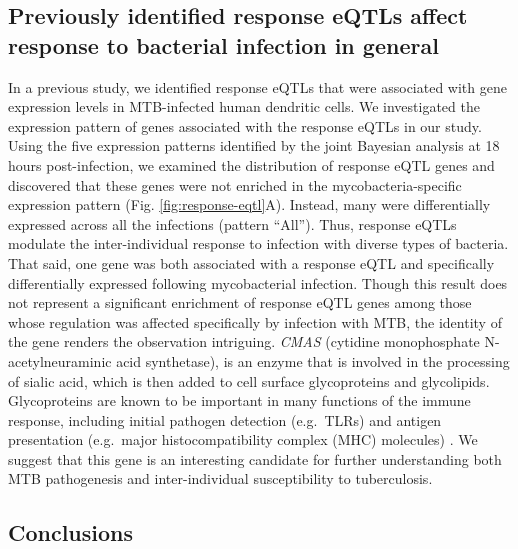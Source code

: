 \subsection{Previously identified response eQTLs affect response to
bacterial infection in
general}\label{previously-identified-response-eqtls-affect-response-to-bacterial-infection-in-general}

In a previous study, we identified response eQTLs that were associated
with gene expression levels in MTB-infected human dendritic cells. We
investigated the expression pattern of genes associated with the
response eQTLs in our study. Using the five expression patterns
identified by the joint Bayesian analysis at 18 hours post-infection, we
examined the distribution of response eQTL genes and discovered that
these genes were not enriched in the mycobacteria-specific expression
pattern (Fig. \ref{fig:response-eqtl}A). Instead, many were differentially expressed across
all the infections (pattern ``All''). Thus, response eQTLs modulate the
inter-individual response to infection with diverse types of bacteria.
That said, one gene was both associated with a response eQTL and
specifically differentially expressed following mycobacterial infection.
Though this result does not represent a significant enrichment of
response eQTL genes among those whose regulation was affected
specifically by infection with MTB, the identity of the gene renders the
observation intriguing. \emph{CMAS} (cytidine monophosphate
N-acetylneuraminic acid synthetase), is an enzyme that is involved in
the processing of sialic acid, which is then added to cell surface
glycoproteins and glycolipids. Glycoproteins are known to be important
in many functions of the immune response, including initial pathogen
detection (e.g.~TLRs) and antigen presentation (e.g.~major
histocompatibility complex (MHC) molecules) \citep{Wolfert2013,
Johnson2013, Crespo2013}. We suggest that this gene is an
interesting candidate for further understanding both MTB pathogenesis
and inter-individual susceptibility to tuberculosis.

\subsection{Conclusions}\label{ch02-conclusions}

